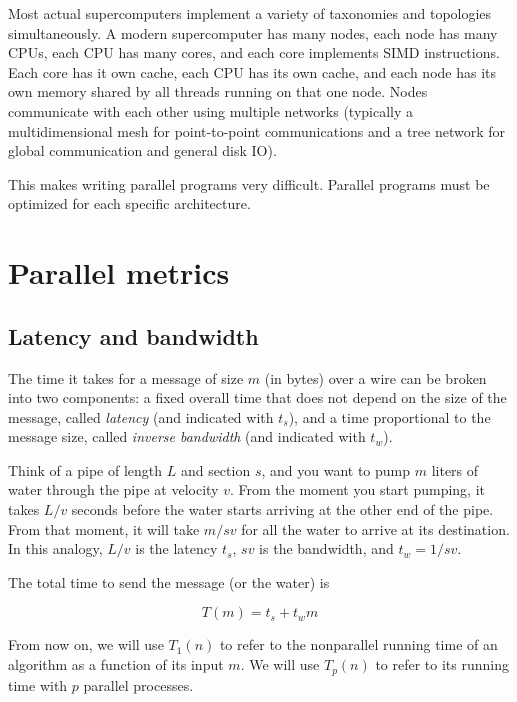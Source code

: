 \documentclass[justified, sixbynine]{tufte-book}
\theoremstyle{plain}%
\newtheorem * {corollary}{Corollary}
\theoremstyle{definition}
\theoremstyle{remark}
\newtheorem * {remark}{Remark}
\newtheorem * {note}{Note}
\begin{document}
\begin{fullwidth}
Most actual supercomputers implement a variety of taxonomies and topologies simultaneously. A modern supercomputer has many nodes, each node has many CPUs, each CPU has many cores, and each core implements SIMD instructions. Each core has it own cache, each CPU has its own cache, and each node has its own memory shared by all threads running on that one node. Nodes communicate with each other using multiple networks (typically a multidimensional mesh for point-to-point communications and a tree network for global communication and general disk IO).

This makes writing parallel programs very difficult. Parallel programs must be optimized for each specific architecture.

\goodbreak\section{Parallel metrics}

\goodbreak\subsection{Latency and bandwidth}


The time it takes for a message of size $m$ (in bytes) over a wire can be broken into two components: a fixed overall time that does not depend on the size of the message, called {\it latency} (and indicated with $t_s$), and a time proportional to the message size, called {\it inverse bandwidth} (and indicated with $t_w$).

Think of a pipe of length $L$ and section $s$, and you want to pump $m$ liters of water through the pipe at velocity $v$. From the moment you start pumping, it takes $L/v$ seconds before the water starts arriving at the other end of the pipe. From that moment, it will take $m / sv$ for all the water to arrive at its destination. In this analogy, $L/v$ is the latency $t_s$, $sv$ is the bandwidth, and $t_w = 1/sv$.

The total time to send the message (or the water) is

\begin{equation}
T(m) = t_s + t_w m
\end{equation}

From now on, we will use $T_1(n)$ to refer to the nonparallel running time of an algorithm as a function of its input $m$. We will use $T_p(n)$ to refer to its running time with $p$ parallel processes.


\end{fullwidth}
\end{document}
